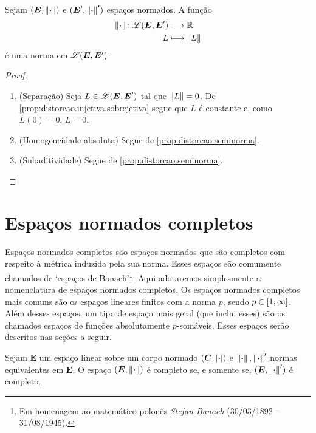 \begin{proposition}
Sejam $(\bm E,\left\Vert{\bm{\cdot}}\right\Vert)$ e $(\bm E',\left\Vert{\bm{\cdot}}\right\Vert')$ espaços normados. A função
	\begin{align*}
	{\left\Vert{\bm{\cdot}}\right\Vert}\colon {\mathscr{L}(\bm E,\bm E')} &\longrightarrow {\mathbb{R}} \\{L} &\longmapsto \left\Vert{L}\right\Vert
	\end{align*}
é uma norma em $\mathscr{L}(\bm E,\bm E')$.
\end{proposition}
\begin{proof}
	\begin{enumerate}
	\item (Separação) Seja $L \in \mathscr{L}(\bm E,\bm E')$ tal que $\left\Vert{L}\right\Vert=0$. De \ref{prop:distorcao.injetiva.sobrejetiva} segue que $L$ é constante e, como $L(0)=0$, $L=0$.

	\item (Homogeneidade absoluta) Segue de \ref{prop:distorcao.seminorma}.

	\item (Subaditividade) Segue de \ref{prop:distorcao.seminorma}.
	\qedhere
	\end{enumerate}
\end{proof}






\section{Espaços normados completos}

Espaços normados completos são espaços normados que são completos com respeito à métrica induzida pela sua norma. Esses espaços são comumente chamados de `espaços de Banach'\footnote{Em homenagem ao matemático polonês \emph{Stefan Banach} (30/03/1892 -- 31/08/1945).}. Aqui adotaremos simplesmente a nomenclatura de espaços normados completos. Os espaços normados completos mais comuns são os espaços lineares finitos com a norma $p$, sendo $p \in \left[1,\allowbreak \infty\right]$. Além desses espaços, um tipo de espaço mais geral (que inclui esses) são os chamados espaços de funções absolutamente $p$-somáveis. Esses espaços serão descritos nas seções a seguir.


\begin{proposition}
Sejam $\bm E$ um espaço linear sobre um corpo normado $(\bm C,\left\vert{\bm{\cdot}}\right\vert)$ e $\left\Vert{\bm{\cdot}}\right\Vert, \left\Vert{\bm{\cdot}}\right\Vert'$ normas equivalentes em $\bm E$. O espaço $(\bm E,\left\Vert{\bm{\cdot}}\right\Vert)$ é completo se, e somente se, $(\bm E,\left\Vert{\bm{\cdot}}\right\Vert')$ é completo.
\end{proposition}

